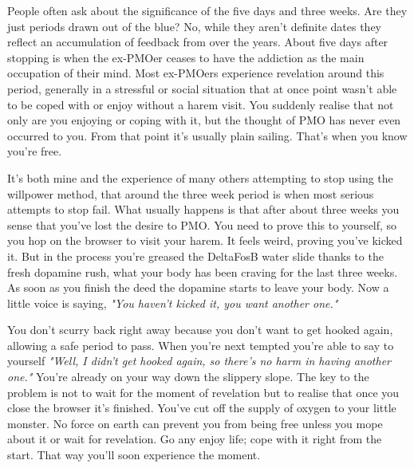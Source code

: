 \documentclass[easypeasy.tex]{subfiles}
\begin{document}
People often ask about the significance of the five days and three weeks. Are they just periods drawn out of the blue? No, while they aren't definite dates they reflect an accumulation of feedback from over the years. About five days after stopping is when the ex-PMOer ceases to have the addiction as the main occupation of their mind. Most ex-PMOers experience revelation around this period, generally in a stressful or social situation that at once point wasn't able to be coped with or enjoy without a harem visit. You suddenly realise that not only are you enjoying or coping with it, but the thought of PMO has never even occurred to you. From that point it's usually plain sailing. That's when you know you're free.

It's both mine and the experience of many others attempting to stop using the willpower method, that around the three week period is when most serious attempts to stop fail. What usually happens is that after about three weeks you sense that you've lost the desire to PMO. You need to prove this to yourself, so you hop on the browser to visit your harem. It feels weird, proving you've kicked it. But in the process you're greased the DeltaFosB water slide thanks to the fresh dopamine rush, what your body has been craving for the last three weeks. As soon as you finish the deed the dopamine starts to leave your body. Now a little voice is saying, \textit{"You haven't kicked it, you want another one."}

You don't scurry back right away because you don't want to get hooked again, allowing a safe period to pass. When you're next tempted you're able to say to yourself \textit{"Well, I didn't get hooked again, so there's no harm in having another one."} You're already on your way down the slippery slope. The key to the problem is not to wait for the moment of revelation but to realise that once you close the browser it's finished. You've cut off the supply of oxygen to your little monster. No force on earth can prevent you from being free unless you mope about it or wait for revelation. Go any enjoy life; cope with it right from the start. That way you'll soon experience the moment.
\end{document}
